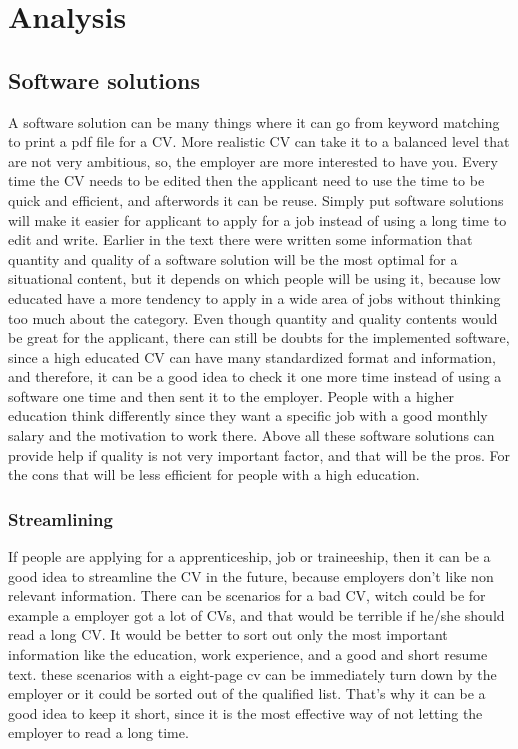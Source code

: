 \section{Analysis}\label{sec:analysis}

\subsection{Software solutions}
A software solution can be many things where it can go from keyword matching to print a pdf file for a CV.
More realistic CV can take it to a balanced level that are not very ambitious, 
so, the employer are more interested to have you. Every time the CV needs to be edited
then the applicant need to use the time to be quick and efficient, and afterwords it can be reuse.
Simply put software solutions will make it easier for applicant to apply for a job instead of using a long time to edit and write. 
Earlier in the text there were written some information 
that quantity and quality of a software solution will be the most optimal for a situational content,
but it depends on which people will be using it, because low educated have a more tendency to apply
in a wide area of jobs without thinking too much about the category. 
Even though quantity and quality contents would be great for the applicant, 
there can still be doubts for the implemented software, since a high educated CV can have many standardized format and information,
and therefore, it can be a good idea to check it one more time instead of using a software one time and then sent it to the employer.
People with a higher education think differently since they want a specific job
with a good monthly salary and the motivation to work there. 
Above all these software solutions can provide help if quality is not very important factor,
and that will be the pros. For the cons that will be less efficient for people with a high education.


\subsubsection{Streamlining}
If people are applying for a apprenticeship, job or traineeship, 
then it can be a good idea to streamline the CV in the future, because employers don't like non relevant information.
There can be scenarios for a bad CV, witch could be for example a employer got a lot of CVs,
and that would be terrible if he/she should read a long CV. It would be better to sort out only the most important information 
like the education, work experience, and a good and short resume text. 
these scenarios with a eight-page cv can be immediately turn down by the employer or it could be sorted out of the qualified list.
That's why it can be a good idea to keep it short, since it is the most effective way of not letting the employer to read a long time.

